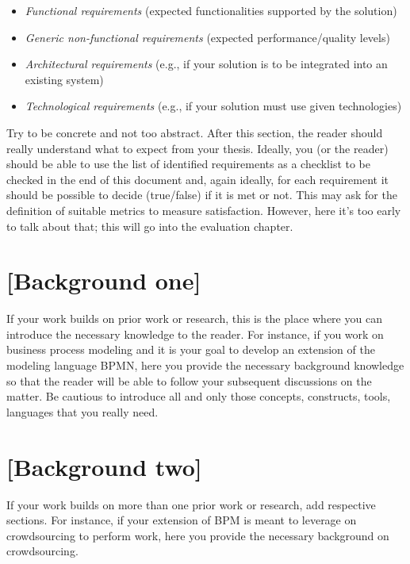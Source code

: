 \begin{itemize}
\item[\Square] \emph{Functional requirements} (expected functionalities supported by the solution)
\item[\Square] \emph{Generic non-functional requirements} (expected performance/quality levels)
\item[\Square] \emph{Architectural requirements} (e.g., if your solution is to be integrated into an existing system)
\item[\Square] \emph{Technological requirements} (e.g., if your solution must use given technologies)
\end{itemize}

Try to be concrete and not too abstract. After this section, the reader should really understand what to expect from your thesis. Ideally, you (or the reader) should be able to use the list of identified requirements as a checklist to be checked in the end of this document and, again ideally, for each requirement it should be possible to decide (true/false) if it is met or not. This may ask for the definition of suitable metrics to measure satisfaction. However, here it's too early to talk about that; this will go into the evaluation chapter.


\section{[Background one]}
If your work builds on prior work or research, this is the place where you can introduce the necessary knowledge to the reader. For instance, if you work on business process modeling and it is your goal to develop an extension of the modeling language BPMN, here you provide the necessary background knowledge so that the reader will be able to follow your subsequent discussions on the matter. Be cautious to introduce all and only those concepts, constructs, tools, languages that you really need.

\section{[Background two]}
If your work builds on more than one prior work or research, add respective sections. For instance, if your extension of BPM is meant to leverage on crowdsourcing to perform work, here you provide the necessary background on crowdsourcing.